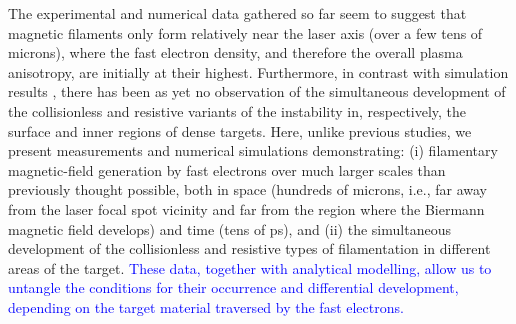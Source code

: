 \documentclass[aps,showpacs,superscriptaddress]{revtex4}
\begin{document}
The experimental and numerical data gathered so far seem to suggest that magnetic filaments only form relatively near the laser axis (over a few tens of microns), where the fast electron density, and therefore the overall plasma anisotropy, are initially at their highest. Furthermore, in contrast with simulation results \cite{POP_Heron_2015, POP_Yang_2016}, there has been as yet no observation of the simultaneous development of the collisionless and resistive variants of the instability in, respectively, the surface and inner regions of dense targets. Here, unlike previous studies, we present measurements and numerical simulations demonstrating: (i) filamentary magnetic-field generation by fast electrons over much larger scales than previously thought possible, both in space (hundreds of microns, i.e., far away from the laser focal spot vicinity and far from the region where the Biermann magnetic field develops) and time (tens of ps), and (ii) the simultaneous development of the collisionless and resistive types of filamentation in different areas of the target. \textcolor{blue}{These data, together with analytical modelling, allow us to untangle the conditions for their occurrence and differential development, depending on the target material traversed by the fast electrons.}
\end{document}
